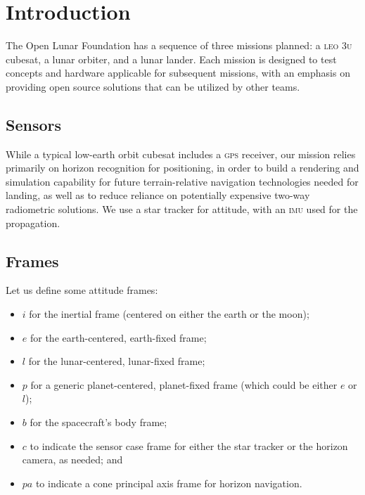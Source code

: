 \documentclass[12pt]{article}
\begin{document}
\maketitle

\section{Introduction}
The Open Lunar Foundation has a sequence of three missions planned: a \textsc{leo} \textsc{3u} cubesat, a lunar orbiter, and a lunar lander. Each mission is designed to test concepts and hardware applicable for subsequent missions, with an emphasis on providing open source solutions that can be utilized by other teams.

\subsection{Sensors}
While a typical low-earth orbit cubesat includes a \textsc{gps} receiver, our mission relies primarily on horizon recognition \citep{Christian2017} for positioning, in order to build a rendering and simulation capability for future terrain-relative navigation technologies needed for landing, as well as to reduce reliance on potentially expensive two-way radiometric solutions. We use a star tracker for attitude, with an \textsc{imu} used for the propagation.

\subsection{Frames}
Let us define some attitude frames:
\begin{itemize}
\item $i$ for the inertial frame (centered on either the earth or the moon);
\item $e$ for the earth-centered, earth-fixed frame;
\item $l$ for the lunar-centered, lunar-fixed frame;
\item $p$ for a generic planet-centered, planet-fixed frame (which could be either $e$ or $l$);
\item $b$ for the spacecraft's body frame;
\item $c$ to indicate the sensor case frame for either the star tracker or the horizon camera, as needed; and
\item $pa$ to indicate a cone principal axis frame for horizon navigation.
\end{itemize}
\end{document}
